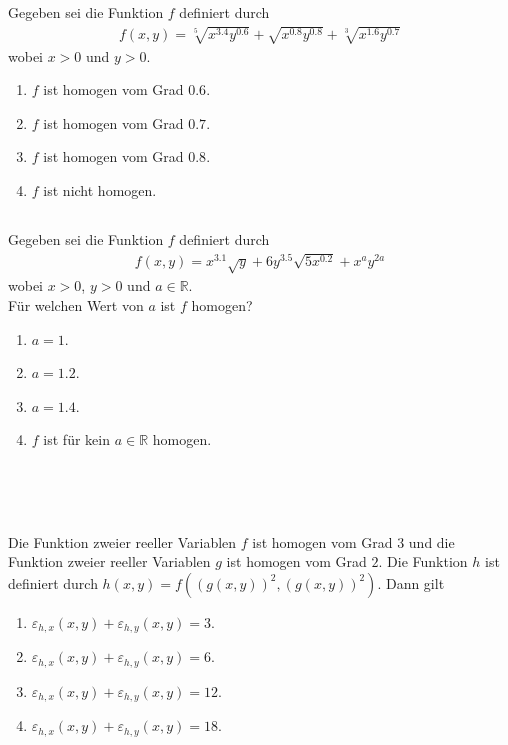 \subsection*{}
Gegeben sei die Funktion $f$ definiert durch
\begin{align*}
f(x,y) = \sqrt[5]{x^{3.4}y^{0.6}}+ \sqrt{x^{0.8}y^{0.8}} 
+ \sqrt[3]{x^{1.6}y^{0.7}}
\end{align*}
wobei $x >0$ und $y> 0$.
\renewcommand{\labelenumi}{(\alph{enumi})}
\begin{enumerate}
\item $f$ ist homogen vom Grad $0.6$.
\item $f$ ist homogen vom Grad $0.7$.
\item $f$ ist homogen vom Grad $0.8$.
\item $f$ ist nicht homogen.
	
\end{enumerate}
\newpage
\subsection*{}
Gegeben sei die Funktion $f$ definiert durch
\begin{align*}
f(x,y) = x^{3.1} \sqrt{y} + 6 y^{3.5} \sqrt{ 5 x^{0.2}}
		+ x^a y^{2a}
\end{align*}
wobei $x > 0 $, $ y >0 $ und $a \in \mathbb{R}$.\\
Für welchen Wert von $a$ ist $f$ homogen?
\renewcommand{\labelenumi}{(\alph{enumi})}
\begin{enumerate}
\item $a = 1$.
\item $a = 1.2$.
\item $a = 1.4$.
\item $f$ ist für kein $a \in \mathbb{R}$ homogen.
	
\end{enumerate}
\ \\
\\
\subsection*{}
Die Funktion zweier reeller Variablen $f$ ist homogen vom Grad $3$ und die Funktion zweier reeller Variablen $g$ ist homogen vom Grad $2$.
Die Funktion $h$ ist definiert durch
$h(x,y) = f\left( (g(x,y))^2, (g(x,y))^2 \right)$.
Dann gilt
\renewcommand{\labelenumi}{(\alph{enumi})}
\begin{enumerate}
\item $\varepsilon_{h,x}(x,y) + \varepsilon_{h,y}(x,y) = 3$.
\item $\varepsilon_{h,x}(x,y) + \varepsilon_{h,y}(x,y) = 6$.
\item $\varepsilon_{h,x}(x,y) + \varepsilon_{h,y}(x,y) = 12$.
\item $\varepsilon_{h,x}(x,y) + \varepsilon_{h,y}(x,y) = 18$.
\end{enumerate}
